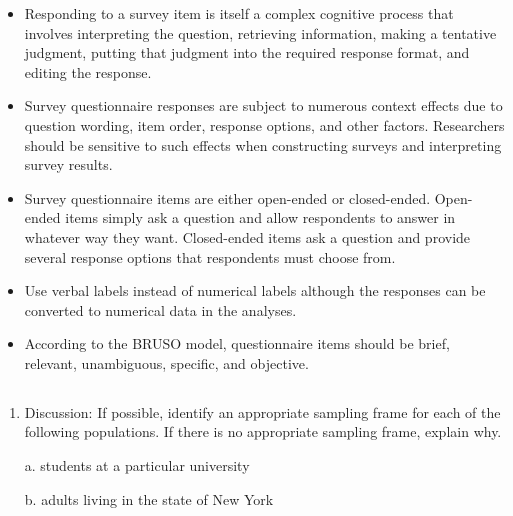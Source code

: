 \begin{fullwidth}

\begin{itemize}


\item Responding to a survey item is itself a complex cognitive process that involves interpreting the question, retrieving information, making a tentative judgment, putting that judgment into the required response format, and editing the response.

\item Survey questionnaire responses are subject to numerous context effects due to question wording, item order, response options, and other factors. Researchers should be sensitive to such effects when constructing surveys and interpreting survey results.

\item Survey questionnaire items are either open-ended or closed-ended. Open-ended items simply ask a question and allow respondents to answer in whatever way they want. Closed-ended items ask a question and provide several response options that respondents must choose from.

\item Use verbal labels instead of numerical labels although the responses can be converted to numerical data in the analyses.

\item According to the BRUSO model, questionnaire items should be brief, relevant, unambiguous, specific, and objective.


\end{itemize}

\end{fullwidth}



\subsection{}

\begin{fullwidth}

\begin{enumerate}

\item  Discussion: If possible, identify an appropriate sampling frame for each of the following populations. If there is no appropriate sampling frame, explain why.

a. students at a particular university

b. adults living in the state of New York

\end{enumerate}

\end{fullwidth}  
